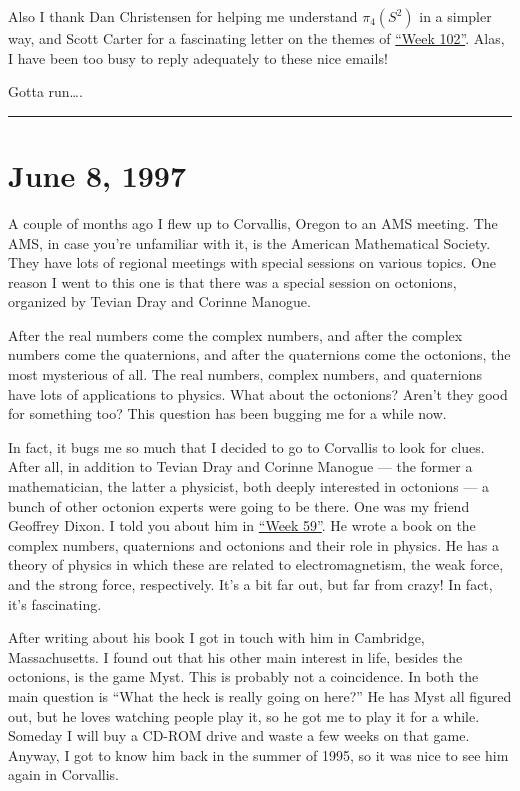 \documentclass{article}
\begin{document}
Also I thank Dan Christensen for helping me understand \(\pi_4(S^2)\) in
a simpler way, and Scott Carter for a fascinating letter on the themes
of \protect\hyperlink{week102}{``Week 102''}. Alas, I have been too busy
to reply adequately to these nice emails!

Gotta run\ldots.

\begin{center}\rule{0.5\linewidth}{0.5pt}\end{center}
\hypertarget{week104}{%
\section{June 8, 1997}\label{week104}}

A couple of months ago I flew up to Corvallis, Oregon to an AMS meeting.
The AMS, in case you're unfamiliar with it, is the American Mathematical
Society. They have lots of regional meetings with special sessions on
various topics. One reason I went to this one is that there was a
special session on octonions, organized by Tevian Dray and Corinne
Manogue.

After the real numbers come the complex numbers, and after the complex
numbers come the quaternions, and after the quaternions come the
octonions, the most mysterious of all. The real numbers, complex
numbers, and quaternions have lots of applications to physics. What
about the octonions? Aren't they good for something too? This question
has been bugging me for a while now.

In fact, it bugs me so much that I decided to go to Corvallis to look
for clues. After all, in addition to Tevian Dray and Corinne Manogue ---
the former a mathematician, the latter a physicist, both deeply
interested in octonions --- a bunch of other octonion experts were going
to be there. One was my friend Geoffrey Dixon. I told you about him in
\protect\hyperlink{week59}{``Week 59''}. He wrote a book on the complex
numbers, quaternions and octonions and their role in physics. He has a
theory of physics in which these are related to electromagnetism, the
weak force, and the strong force, respectively. It's a bit far out, but
far from crazy! In fact, it's fascinating.

After writing about his book I got in touch with him in Cambridge,
Massachusetts. I found out that his other main interest in life, besides
the octonions, is the game Myst. This is probably not a coincidence. In
both the main question is ``What the heck is really going on here?'' He
has Myst all figured out, but he loves watching people play it, so he
got me to play it for a while. Someday I will buy a CD-ROM drive and
waste a few weeks on that game. Anyway, I got to know him back in the
summer of 1995, so it was nice to see him again in Corvallis.
\end{document}
